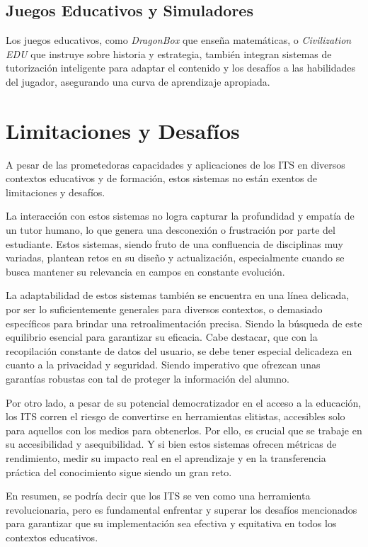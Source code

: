 \subsection{Juegos Educativos y Simuladores}

Los juegos educativos, como \textit {DragonBox} \cite{dragonbox} que enseña matemáticas, o \textit {Civilization EDU} \cite{civilizationedu} que instruye sobre historia y estrategia, también integran sistemas de tutorización inteligente para adaptar el contenido y los desafíos a las habilidades del jugador, asegurando una curva de aprendizaje apropiada.


\section{Limitaciones y Desafíos}

A pesar de las prometedoras capacidades y aplicaciones de los ITS en diversos contextos educativos y de formación, estos sistemas no están exentos de limitaciones y desafíos. 

La interacción con estos sistemas no logra capturar la profundidad y empatía de un tutor humano, lo que genera una desconexión o frustración por parte del estudiante. Estos sistemas, siendo fruto de una confluencia de disciplinas muy variadas, plantean retos en su diseño y actualización, especialmente cuando se busca mantener su relevancia en campos en constante evolución.

La adaptabilidad de estos sistemas también se encuentra en una línea delicada, por ser lo suficientemente generales para diversos contextos, o demasiado específicos para brindar una retroalimentación precisa. Siendo la búsqueda de este equilibrio esencial para garantizar su eficacia. Cabe destacar, que con la recopilación constante de datos del usuario, se debe tener especial delicadeza en cuanto a la privacidad y seguridad. Siendo imperativo que ofrezcan unas garantías robustas con tal de proteger la información del alumno.

Por otro lado, a pesar de su potencial democratizador en el acceso a la educación, los ITS corren el riesgo de convertirse en herramientas elitistas, accesibles solo para aquellos con los medios para obtenerlos. Por ello, es crucial que se trabaje en su accesibilidad y asequibilidad. Y si bien estos sistemas ofrecen métricas de rendimiento, medir su impacto real en el aprendizaje y en la transferencia práctica del conocimiento sigue siendo un gran reto.

En resumen, se podría decir que los ITS se ven como una herramienta revolucionaria, pero es fundamental enfrentar y superar los desafíos mencionados para garantizar que su implementación sea efectiva y equitativa en todos los contextos educativos.

